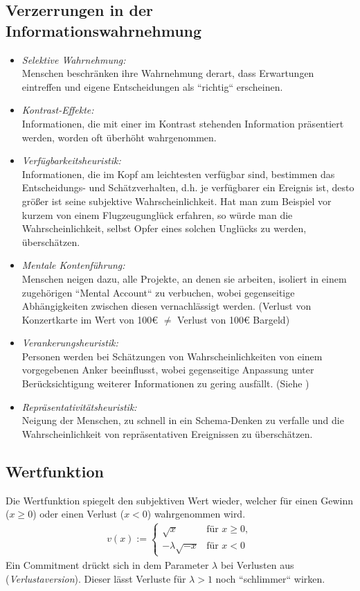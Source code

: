 \documentclass[12pt,a4paper]{scrartcl}
\begin{document}
\subsection{Verzerrungen in der Informationswahrnehmung \cite{vonNitzsch:211553}}
\begin{itemize}
	\item \textit{Selektive Wahrnehmung:}\\
	Menschen beschränken ihre Wahrnehmung derart, dass Erwartungen eintreffen und eigene Entscheidungen als ``richtig`` erscheinen.
	\item \textit{Kontrast-Effekte:}\\
	Informationen, die mit einer im Kontrast stehenden Information präsentiert werden, worden oft überhöht wahrgenommen.
	\item \textit{Verfügbarkeitsheuristik:}\\
	Informationen, die im Kopf am leichtesten verfügbar sind, bestimmen das Entscheidungs- und Schätzverhalten, d.h. je verfügbarer ein Ereignis ist, desto größer ist seine subjektive Wahrscheinlichkeit. Hat man zum Beispiel vor kurzem von einem Flugzeugunglück erfahren, so würde man die Wahrscheinlichkeit, selbst Opfer eines solchen Unglücks zu werden, überschätzen.
	\item \textit{Mentale Kontenführung:}\\
	Menschen neigen dazu, alle Projekte, an denen sie arbeiten, isoliert in einem zugehörigen ``Mental Account`` zu verbuchen, wobei gegenseitige Abhängigkeiten zwischen diesen vernachlässigt werden. (Verlust von Konzertkarte im Wert von 100€ $ \neq $ Verlust von 100€ Bargeld)
	\item \textit{Verankerungsheuristik:}\\
	Personen werden bei Schätzungen von Wahrscheinlichkeiten von einem vorgegebenen Anker beeinflusst, wobei gegenseitige Anpassung unter Berücksichtigung weiterer Informationen zu gering ausfällt. (Siehe )
	\item \textit{Repräsentativitätsheuristik:}\\
	Neigung der Menschen, zu schnell in ein Schema-Denken zu verfalle und die Wahrscheinlichkeit von repräsentativen Ereignissen zu überschätzen.
\end{itemize}

\subsection{Wertfunktion}
Die Wertfunktion spiegelt den subjektiven Wert wieder, welcher für einen Gewinn ($ x \geq 0 $) oder einen Verlust ($ x < 0 $) wahrgenommen wird.
\begin{align*}
	v(x) := \begin{cases}
	\sqrt{x} & \text{für } x\geq 0,\\
	-\lambda\sqrt{-x} & \text{für } x < 0
	\end{cases}
\end{align*}
Ein Commitment drückt sich in dem Parameter $ \lambda $ bei Verlusten aus (\textit{Verlustaversion}). Dieser lässt Verluste für $ \lambda > 1 $ noch ``schlimmer`` wirken.
\end{document}
